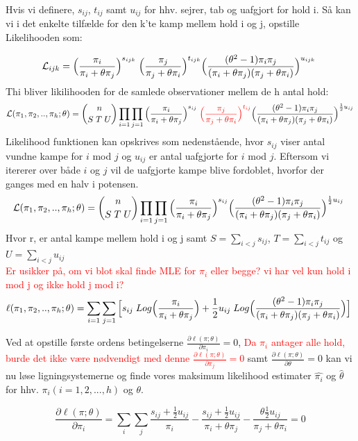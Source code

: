 \documentclass[11pt,a4paper]{article}
\begin{document}
Hvis vi definere, $s_{ij}$, $t_{ij}$ samt $u_{ij}$ for hhv. sejrer, tab og uafgjort for hold i. Så kan vi i det enkelte tilfælde for den k'te kamp mellem hold i og j, opstille Likelihooden som: 

$$
\mathcal{L}_{ijk}=\Big{(}\frac{\pi_i}{\pi_i+\theta\pi_j}\Big{)}^{s_{ijk}}
\;\Big{(}\frac{\pi_j}{\pi_j+\theta\pi_i}\Big{)}^{t_{ijk}}
\Big{(}\frac{(\theta^2-1)\pi_i \pi_j}{(\pi_i+\theta\pi_j)(\pi_j+\theta\pi_i)}\Big{)}^{u_{ijk}}
\;
$$
Thi bliver likilihooden for de samlede observationer mellem de h antal hold:
$$
\mathcal{L}(\pi_1,\pi_2,..,\pi_h;\theta)=\binom{n}{S\;T\;U}\prod_{i=1}\prod_{j=1}\Big{(}\frac{\pi_i}{\pi_i+\theta\pi_j}\Big{)}^{s_{ij}}
\;\textcolor{red}{\Big{(}\frac{\pi_j}{\pi_j+\theta\pi_i}\Big{)}^{t_{ij}}}
\Big{(}\frac{(\theta^2-1)\pi_i \pi_j}{(\pi_i+\theta\pi_j)(\pi_j+\theta\pi_i)}\Big{)}^{\frac{1}{2}u_{ij}}
$$
Likelihood funktionen kan opskrives som nedenstående, hvor $s_{ij}$ viser antal vundne kampe for $i$ mod $j$ og $u_{ij}$ er antal uafgjorte for $i$ mod $j$. Eftersom vi itererer over både $i$ og $j$ vil de uafgjorte kampe blive fordoblet, hvorfor der ganges med en halv i potensen. 
$$
\mathcal{L}(\pi_1,\pi_2,..,\pi_h;\theta)=\binom{n}{S\;T\;U}\prod_{i=1}\prod_{j=1}\Big{(}\frac{\pi_i}{\pi_i+\theta\pi_j}\Big{)}^{s_{ij}}
\Big{(}\frac{(\theta^2-1)\pi_i \pi_j}{(\pi_i+\theta\pi_j)(\pi_j+\theta\pi_i)}\Big{)}^{\frac{1}{2}u_{ij}}
\;
$$
Hvor r, er antal kampe mellem hold i og j samt $S=\sum_{i<j}s_{ij}$,  $T=\sum_{i<j}t_{ij}$ og $U=\sum_{i<j}u_{ij}$
\\
\textcolor{red}{Er usikker på, om vi blot skal finde MLE for $\pi_i$ eller begge? vi har vel kun hold i mod j og ikke hold j mod i?}
\\
$$
\ell(\pi_1,\pi_2,..,\pi_h;\theta)=\sum_{i=1}\sum_{j=1}\Big{[}s_{ij}\;Log\Big{(}\frac{\pi_i}{\pi_i+\theta\pi_j}\Big{)}+
\frac{1}{2}u_{ij}\;Log\Big{(}\frac{(\theta^2-1)\pi_i \pi_j}{(\pi_i+\theta\pi_j)(\pi_j+\theta\pi_i)}\Big{)}\Big{]}
\;
$$

Ved at opstille første ordens betingelserne $\frac{\partial \ell(\pi;\theta)}{\partial \pi_i}=0$, 
\textcolor{red}{Da $\pi_i$ antager alle hold, burde det ikke være nødvendigt med denne
$\frac{\partial \ell(\pi;\theta)}{\partial \pi_j}=0$} samt $\frac{\partial \ell(\pi;\theta)}{\partial \theta}=0$ kan vi nu løse ligningsystemerne og finde vores maksimum likelihood estimater $\hat{\pi_i}$ og $\hat{\theta}$ for hhv. $\pi_i(i=1,2,...,h)$ og $\theta$. 

\begin{equation}
\frac{\partial \ell(\pi;\theta)}{\partial \pi_i}=\sum_i\sum_j \frac{s_{ij}+\frac{1}{2}u_{ij}}{\pi_i}-\frac{s_{ij}+\frac{1}{2}u_{ij}}{\pi_i+\theta\pi_j}-\frac{\theta\frac{1}{2}u_{ij}}{\pi_j+\theta\pi_i}=0
\end{equation}
\end{document}
